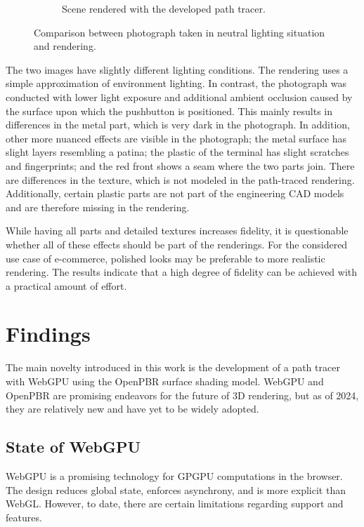 \begin{figure}[H]
\begin{subfigure}[t]{0.45\textwidth}
    \caption{Scene rendered with the developed path tracer.}
    \label{fig:real-rendering}
  \end{subfigure}
  \hspace*{0.2cm}
  \caption{Comparison between photograph taken in neutral lighting situation and rendering.}
  \label{fig:real-rendering-comparison}
\end{figure}

The two images have slightly different lighting conditions. The rendering uses a simple approximation of environment lighting. In contrast, the photograph was conducted with lower light exposure and additional ambient occlusion caused by the surface upon which the pushbutton is positioned. This mainly results in differences in the metal part, which is very dark in the photograph. In addition, other more nuanced effects are visible in the photograph; the metal surface has slight layers resembling a patina; the plastic of the terminal has slight scratches and fingerprints; and the red front shows a seam where the two parts join. There are differences in the texture, which is not modeled in the path-traced rendering. Additionally, certain plastic parts are not part of the engineering \gls{CAD} models and are therefore missing in the rendering.

While having all parts and detailed textures increases fidelity, it is questionable whether all of these effects should be part of the renderings. For the considered use case of e-commerce, polished looks may be preferable to more realistic rendering. The results indicate that a high degree of fidelity can be achieved with a practical amount of effort.

\newpage

\section{Findings}

The main novelty introduced in this work is the development of a path tracer with \gls{WebGPU} using the \gls{OpenPBR} surface shading model. \gls{WebGPU} and \gls{OpenPBR} are promising endeavors for the future of 3D rendering, but as of 2024, they are relatively new and have yet to be widely adopted.

\subsection*{State of WebGPU}

\gls{WebGPU} is a promising technology for \gls{GPGPU} computations in the browser. The design reduces global state, enforces asynchrony, and is more explicit than \gls{WebGL}. However, to date, there are certain limitations regarding support and features.

